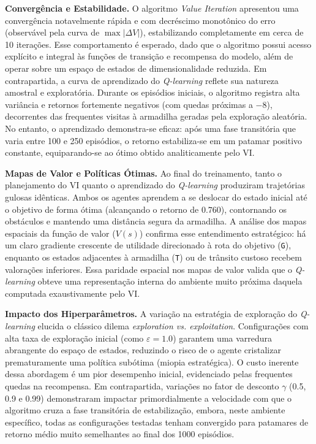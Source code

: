 \documentclass[a4paper,11pt]{article}
\begin{document}
\textbf{Convergência e Estabilidade.} O algoritmo \textit{Value Iteration} apresentou uma convergência notavelmente rápida e com decréscimo monotônico do erro (observável pela curva de $\max|\Delta V|$), estabilizando completamente em cerca de 10 iterações. Esse comportamento é esperado, dado que o algoritmo possui acesso explícito e integral às funções de transição e recompensa do modelo, além de operar sobre um espaço de estados de dimensionalidade reduzida. Em contrapartida, a curva de aprendizado do \textit{Q-learning} reflete sua natureza amostral e exploratória. Durante os episódios iniciais, o algoritmo registra alta variância e retornos fortemente negativos (com quedas próximas a $-8$), decorrentes das frequentes visitas à armadilha geradas pela exploração aleatória. No entanto, o aprendizado demonstra-se eficaz: após uma fase transitória que varia entre 100 e 250 episódios, o retorno estabiliza-se em um patamar positivo constante, equiparando-se ao ótimo obtido analiticamente pelo VI.

\textbf{Mapas de Valor e Políticas Ótimas.} Ao final do treinamento, tanto o planejamento do VI quanto o aprendizado do \textit{Q-learning} produziram trajetórias gulosas idênticas. Ambos os agentes aprendem a se deslocar do estado inicial até o objetivo de forma ótima (alcançando o retorno de $0.760$), contornando os obstáculos e mantendo uma distância segura da armadilha. A análise dos mapas espaciais da função de valor ($V(s)$) confirma esse entendimento estratégico: há um claro gradiente crescente de utilidade direcionado à rota do objetivo (\texttt{G}), enquanto os estados adjacentes à armadilha (\texttt{T}) ou de trânsito custoso recebem valorações inferiores. Essa paridade espacial nos mapas de valor valida que o \textit{Q-learning} obteve uma representação interna do ambiente muito próxima daquela computada exaustivamente pelo VI.

\textbf{Impacto dos Hiperparâmetros.} A variação na estratégia de exploração do \textit{Q-learning} elucida o clássico dilema \textit{exploration vs. exploitation}. Configurações com alta taxa de exploração inicial (como $\varepsilon = 1.0$) garantem uma varredura abrangente do espaço de estados, reduzindo o risco de o agente cristalizar prematuramente uma política subótima (miopia estratégica). O custo inerente dessa abordagem é um pior desempenho inicial, evidenciado pelas frequentes quedas na recompensa. Em contrapartida, variações no fator de desconto $\gamma$ (0.5, 0.9 e 0.99) demonstraram impactar primordialmente a velocidade com que o algoritmo cruza a fase transitória de estabilização, embora, neste ambiente específico, todas as configurações testadas tenham convergido para patamares de retorno médio muito semelhantes ao final dos 1000 episódios.
\end{document}
